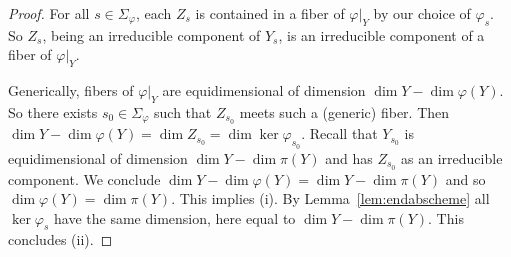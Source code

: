 \documentclass[12pt,oneside]{amsart}
\begin{document}
\begin{proof}
  For all $s\in \Sigma_{\varphi}$, 
  each $Z_s$ is contained in a fiber of $\varphi|_Y$  by our  choice of $\varphi_s$.
  So $Z_s$, being an irreducible component of
  $Y_s$, is an irreducible component of a fiber of $\varphi|_Y$.
  
  Generically, fibers of $\varphi|_Y$ are equidimensional of  dimension $\dim Y -
  \dim\varphi(Y)$.
  So there exists $s_0\in \Sigma_\varphi$ such that $Z_{s_0}$ meets such a (generic) 
  fiber.
  Then 
  $\dim Y - \dim\varphi(Y) = \dim Z_{s_0}= \dim\ker\varphi_{s_0}$.
  Recall that  $Y_{s_0}$ is equidimensional of dimension $\dim Y -
  \dim \pi(Y)$ and has $Z_{s_0}$ as an irreducible component. We conclude
  $\dim Y - \dim\varphi(Y) = \dim Y -\dim\pi(Y)$ and so 
  $\dim\varphi(Y) =
  \dim\pi(Y)$. This implies (i).
  By Lemma~\ref{lem:endabscheme} all  $\ker\varphi_s$ have
  the same dimension, here equal to $\dim Y
  -\dim\pi(Y)$. This concludes (ii). 
\end{proof}
\end{document}
